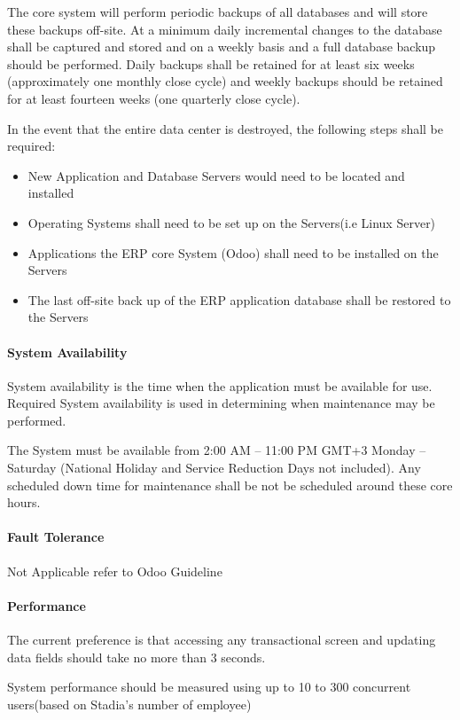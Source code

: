 The core system will perform periodic backups of all databases and will store these backups off-site.  At a minimum daily incremental changes to the database shall be captured and stored and on a weekly basis and a full database backup should be performed.  Daily backups shall be retained for at least six weeks (approximately one monthly close cycle) and weekly backups should be retained for at least fourteen weeks (one quarterly close cycle).  

In the event that the entire data center is destroyed, the following steps shall be required:
\begin{itemize}
	\item New Application and Database Servers would need to be located and installed
	\item Operating Systems shall need to be set up on the Servers(i.e Linux Server)
	\item Applications the ERP core System (Odoo) shall need to be installed on the Servers
	\item The last off-site back up of the ERP application database shall be restored to the Servers
\end{itemize}

\paragraph{System Availability}
System availability is the time when the application must be available for use. Required System availability is used in determining when maintenance may be performed.

The System must be available from 2:00 AM – 11:00 PM GMT+3 Monday – Saturday (National Holiday and Service Reduction Days not included).  Any scheduled down time for maintenance shall be not be scheduled around these core hours.

\paragraph{Fault Tolerance}
Not Applicable refer to Odoo Guideline

\paragraph{Performance}
The current preference is that accessing any transactional screen and updating data fields should take no more than 3 seconds.

System performance should be measured using up to 10 to 300 concurrent users(based on Stadia's number of employee)

